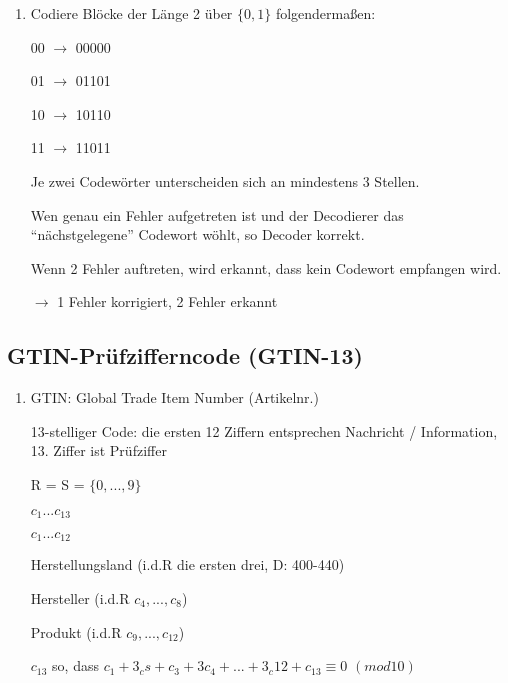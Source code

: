 \begin{enumerate}[label=(\alph*)]
    \item Codiere Blöcke der Länge 2 über $\{0,1\}$ folgendermaßen:

    00 $\rightarrow$ 00000

    01 $\rightarrow$ 01101

    10 $\rightarrow$ 10110

    11 $\rightarrow$ 11011

    \par \medskip

    Je zwei Codewörter unterscheiden sich an mindestens 3 Stellen.

    Wen genau ein Fehler aufgetreten ist und der Decodierer das ``nächstgelegene'' Codewort wöhlt, so Decoder korrekt.

    Wenn 2 Fehler auftreten, wird erkannt, dass kein Codewort empfangen wird.

    $\rightarrow$ 1 Fehler korrigiert, 2 Fehler erkannt
  \end{enumerate}

  \subsection{GTIN-Prüfzifferncode (GTIN-13)}

  \begin{enumerate}[label=(\alph*)]
    \item GTIN: Global Trade Item Number (Artikelnr.)

    13-stelliger Code: die ersten 12 Ziffern entsprechen Nachricht / Information, 13. Ziffer ist Prüfziffer

    R = S = $\{0,...,9\}$

    \par \medskip

    $c_1 ... c_{13}$

    \newpage

    \underline{$c_1 ... c_{12}$}

    Herstellungsland (i.d.R die ersten drei, D: 400-440)

    Hersteller (i.d.R $c_4, ..., c_8$)

    Produkt (i.d.R $c_9, ..., c_{12}$)

    \par \medskip

    $c_{13}$ so, dass $c_1 + 3_cs + c_3 + 3c_4 + ... + 3_c{12} + c_{13} \equiv 0$ $(mod 10)$
  \end{enumerate}

